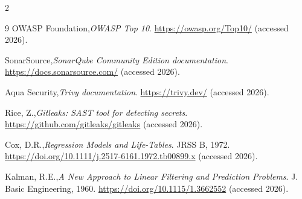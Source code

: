 \begin{small}
\begin{multicols}{2}
\begin{thebibliography}{9}
OWASP Foundation,\emph{OWASP Top 10}. \url{https://owasp.org/Top10/} (accessed 2026).

SonarSource,\emph{SonarQube Community Edition documentation}. \url{https://docs.sonarsource.com/} (accessed 2026).

Aqua Security,\emph{Trivy documentation}. \url{https://trivy.dev/} (accessed 2026).

Rice, Z.,\emph{Gitleaks: SAST tool for detecting secrets}. \url{https://github.com/gitleaks/gitleaks} (accessed 2026).

Cox, D.R.,\emph{Regression Models and Life-Tables}. JRSS B, 1972. \url{https://doi.org/10.1111/j.2517-6161.1972.tb00899.x} (accessed 2026).

Kalman, R.E.,\emph{A New Approach to Linear Filtering and Prediction Problems}. J. Basic Engineering, 1960. \url{https://doi.org/10.1115/1.3662552} (accessed 2026).

\end{thebibliography}
\end{multicols}
\end{small}
